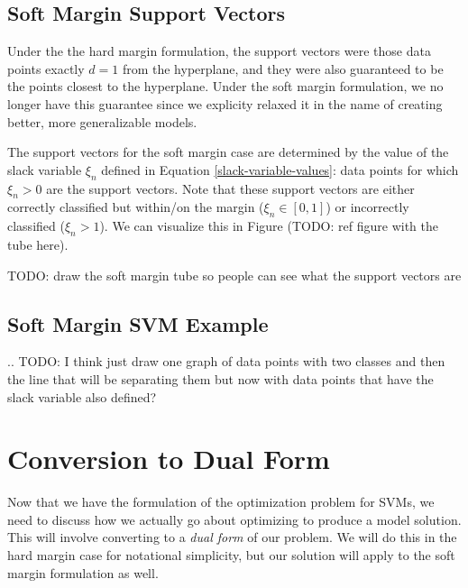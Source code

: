 
\subsection{Soft Margin Support Vectors}
Under the the hard margin formulation, the support vectors were those data points exactly $d=1$ from the hyperplane, and they were also guaranteed to be the points closest to the hyperplane. Under the soft margin formulation, we no longer have this guarantee since we explicity relaxed it in the name of creating better, more generalizable models.

The support vectors for the soft margin case are determined by the value of the slack variable $\xi_{n}$ defined in Equation \ref{slack-variable-values}: data points for which $\xi_{n} > 0$ are the support vectors. Note that these support vectors are either correctly classified but within/on the margin ($\xi_{n} \in [0,1]$) or incorrectly classified ($\xi_{n} > 1$). We can visualize this in Figure (TODO: ref figure with the tube here).


TODO: draw the soft margin tube so people can see what the support vectors are

\subsection{Soft Margin SVM Example}
.. TODO: I think just draw one graph of data points with two classes and then the line that will be separating them but now with data points that have the slack variable also defined?

\section{Conversion to Dual Form}
Now that we have the formulation of the optimization problem for SVMs, we need to discuss how we actually go about optimizing to produce a model solution. This will involve converting to a \textit{dual form} of our problem. We will do this in the hard margin case for notational simplicity, but our solution will apply to the soft margin formulation as well.


